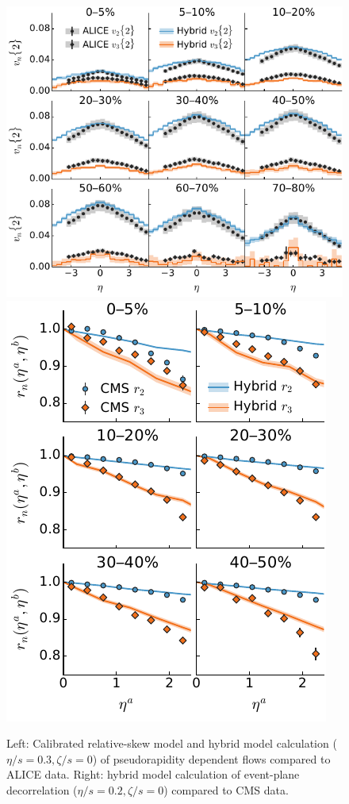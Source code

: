 \documentclass[3p,times,twocolumn]{elsarticle}
\begin{document}
\begin{center}
\begin{figure}
\includegraphics[scale=0.85]{vn_eta.pdf}
\hfill
\includegraphics[scale=0.85]{evt_pln_decorr.pdf}
\caption{
	\label{fig:eta-obs}
	Left: Calibrated relative-skew model and hybrid model calculation ($\eta/s=0.3, \zeta/s=0$) of pseudorapidity dependent flows compared to ALICE data. Right: hybrid model calculation of event-plane decorrelation ($\eta/s=0.2, \zeta/s=0$) compared to CMS data.}
\end{figure}
\end{center}
\end{document}
